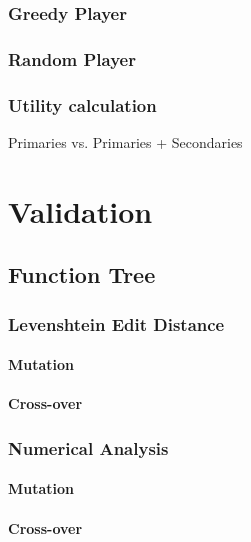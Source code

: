 \documentclass{acm_proc_article-sp}
\begin{document}
        \subsubsection{Greedy Player}
    
        \subsubsection{Random Player}

        \subsubsection{Utility calculation}
        
            Primaries vs. Primaries + Secondaries
            
\section{Validation}

    \subsection{Function Tree}
    
        \subsubsection{Levenshtein Edit Distance}
        
            \paragraph{Mutation}
            \paragraph{Cross-over}
            
        \subsubsection{Numerical Analysis}
        
            \paragraph{Mutation}
            \paragraph{Cross-over}
            
\end{document}

